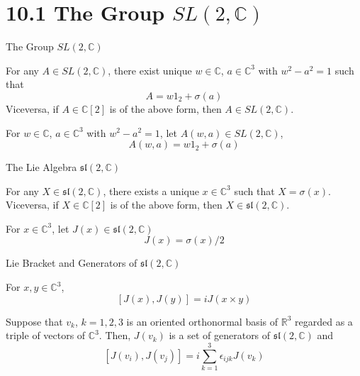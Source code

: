 \section{10.1 The Group $SL(2,\mathbb{C})$}

\begin{frame}{The Group $SL(2,\mathbb{C})$}
    \begin{proposition}[10.1.1]
        For any $A \in SL(2,\mathbb{C})$, there exist unique $w \in \mathbb{C}$, $a \in \mathbb{C}^3$ with $w^2 - a^2 = 1$ such that
        \[ A = w1_2 + \sigma(a) \]
        Viceversa, if $A \in \mathbb{C}[2]$ is of the above form, then $A \in SL(2,\mathbb{C})$.
    \end{proposition}

    \begin{definition}[10.1.1]
        For $w \in \mathbb{C}$, $a \in \mathbb{C}^3$ with $w^2 - a^2 = 1$, let $A(w,a) \in SL(2,\mathbb{C})$,
        \[ A(w,a) = w1_2 + \sigma(a) \]
    \end{definition}
\end{frame}

\begin{frame}{The Lie Algebra $\mathfrak{sl}(2,\mathbb{C})$}
    \begin{proposition}[10.1.2]
        For any $X \in \mathfrak{sl}(2,\mathbb{C})$, there exists a unique $x \in \mathbb{C}^3$ such that $X = \sigma(x)$. Viceversa, if $X \in \mathbb{C}[2]$ is of the above form, then $X \in \mathfrak{sl}(2,\mathbb{C})$.
    \end{proposition}

    \begin{definition}[10.1.2]
        For $x \in \mathbb{C}^3$, let $J(x) \in \mathfrak{sl}(2,\mathbb{C})$
        \[ J(x) = \sigma(x)/2 \]
    \end{definition}
\end{frame}

\begin{frame}{Lie Bracket and Generators of $\mathfrak{sl}(2,\mathbb{C})$}
    \begin{proposition}[10.1.3]
        For $x, y \in \mathbb{C}^3$,
        \[ [J(x), J(y)] = iJ(x \times y) \]
    \end{proposition}

    \begin{proposition}[10.1.4]
        Suppose that $v_k$, $k=1,2,3$ is an oriented orthonormal basis of $\mathbb{R}^3$ regarded as a triple of vectors of $\mathbb{C}^3$. Then, $J(v_k)$ is a set of generators of $\mathfrak{sl}(2,\mathbb{C})$ and
        \[ [J(v_i), J(v_j)] = i\sum_{k=1}^3 \epsilon_{ijk}J(v_k) \]
    \end{proposition}
\end{frame}

